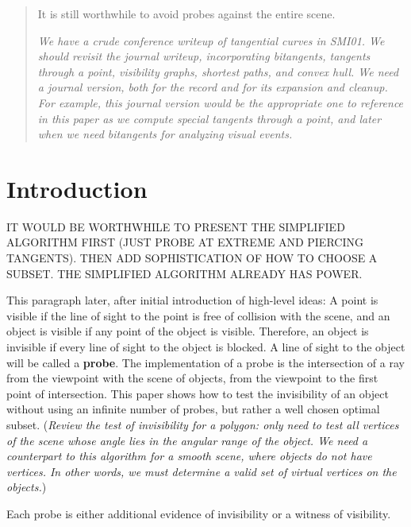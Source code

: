 \documentclass[12pt]{article}
\begin{document}
\begin{abstract}
It is still worthwhile to avoid probes against the entire scene.

{\em We have a crude conference writeup of tangential curves in SMI01.
We should revisit the journal writeup, incorporating bitangents, tangents through a 
point, visibility graphs, shortest paths, and convex hull.
We need a journal version, both for the record and for its expansion and cleanup.
For example, this journal version would be the appropriate one to reference
in this paper as we compute special tangents through a point, and later when
we need bitangents for analyzing visual events.}
\end{abstract}


\clearpage


\section{Introduction}

IT WOULD BE WORTHWHILE TO PRESENT THE SIMPLIFIED ALGORITHM FIRST
(JUST PROBE AT EXTREME AND PIERCING TANGENTS).
THEN ADD SOPHISTICATION OF HOW TO CHOOSE A SUBSET.
THE SIMPLIFIED ALGORITHM ALREADY HAS POWER.

This paragraph later, after initial introduction of high-level ideas:
A point is visible if the line of sight to the point is free of collision with the scene,
and an object is visible if any point of the object is visible.
Therefore, an object is invisible if every line of sight to the object is blocked.
A line of sight to the object will be called a {\bf probe}.
The implementation of a probe is the intersection of a ray from the viewpoint
with the scene of objects, from the viewpoint to the first point of intersection.
This paper shows how to test the invisibility of an object without using an infinite
number of probes, but rather a well chosen optimal subset.
({\em Review the test of invisibility for a polygon: only need to test all vertices of the
scene whose angle lies in the angular range of the object.
We need a counterpart to this algorithm for a smooth scene, where objects do not
have vertices.
In other words, we must determine a valid set of virtual vertices on the objects.})

Each probe is either additional evidence of invisibility or a witness of visibility.
\end{document}
